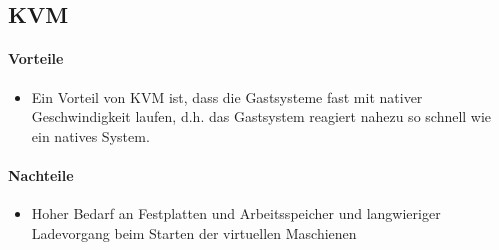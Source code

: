 \subsection{KVM} %
\paragraph{Vorteile}
\begin{itemize}
	\item Ein Vorteil von KVM ist, dass die Gastsysteme fast mit nativer Geschwindigkeit laufen, d.h. das Gastsystem reagiert nahezu so schnell wie ein natives System. 
\end{itemize}
\paragraph{Nachteile}
\begin{itemize}
	\item Hoher Bedarf an Festplatten und Arbeitsspeicher und langwieriger Ladevorgang beim Starten der virtuellen Maschienen
\end{itemize}


